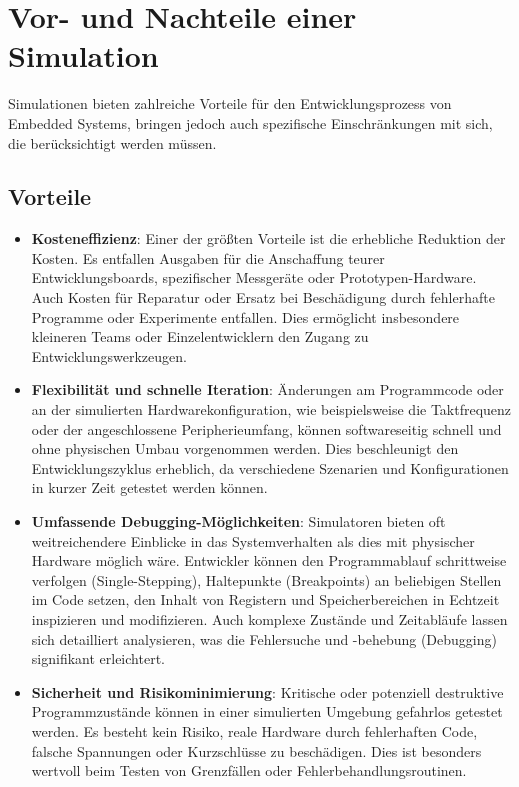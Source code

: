 \section{Vor- und Nachteile einer Simulation}

Simulationen bieten zahlreiche Vorteile für den Entwicklungsprozess von Embedded Systems, bringen jedoch auch spezifische Einschränkungen mit sich, die berücksichtigt werden müssen.

\subsection*{Vorteile}
\begin{itemize}
    \item \textbf{Kosteneffizienz}: Einer der größten Vorteile ist die erhebliche Reduktion der Kosten. Es entfallen Ausgaben für die Anschaffung teurer Entwicklungsboards, spezifischer Messgeräte oder Prototypen-Hardware. Auch Kosten für Reparatur oder Ersatz bei Beschädigung durch fehlerhafte Programme oder Experimente entfallen. Dies ermöglicht insbesondere kleineren Teams oder Einzelentwicklern den Zugang zu Entwicklungswerkzeugen.
    \item \textbf{Flexibilität und schnelle Iteration}: Änderungen am Programmcode oder an der simulierten Hardwarekonfiguration, wie beispielsweise die Taktfrequenz oder der angeschlossene Peripherieumfang, können softwareseitig schnell und ohne physischen Umbau vorgenommen werden. Dies beschleunigt den Entwicklungszyklus erheblich, da verschiedene Szenarien und Konfigurationen in kurzer Zeit getestet werden können.
    \item \textbf{Umfassende Debugging-Möglichkeiten}: Simulatoren bieten oft weitreichendere Einblicke in das Systemverhalten als dies mit physischer Hardware möglich wäre. Entwickler können den Programmablauf schrittweise verfolgen (Single-Stepping), Haltepunkte (Breakpoints) an beliebigen Stellen im Code setzen, den Inhalt von Registern und Speicherbereichen in Echtzeit inspizieren und modifizieren. Auch komplexe Zustände und Zeitabläufe lassen sich detailliert analysieren, was die Fehlersuche und -behebung (Debugging) signifikant erleichtert.
    \item \textbf{Sicherheit und Risikominimierung}: Kritische oder potenziell destruktive Programmzustände können in einer simulierten Umgebung gefahrlos getestet werden. Es besteht kein Risiko, reale Hardware durch fehlerhaften Code, falsche Spannungen oder Kurzschlüsse zu beschädigen. Dies ist besonders wertvoll beim Testen von Grenzfällen oder Fehlerbehandlungsroutinen.

\end{itemize}
